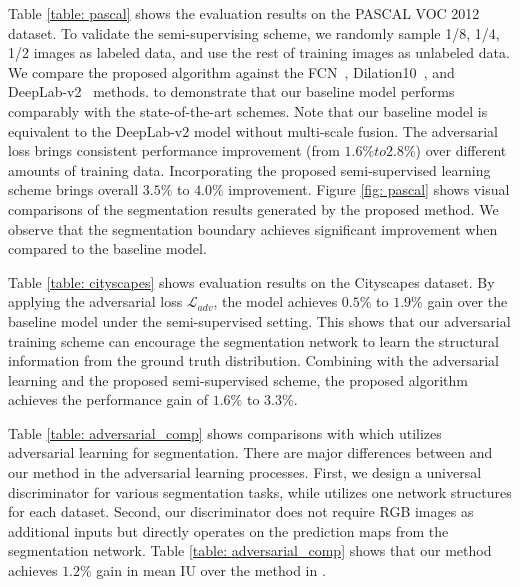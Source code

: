 \documentclass{bmvc2k}
\begin{document}
	\vspace{-2mm}{\flushleft \bf PASCAL VOC 2012.}
	Table \ref{table: pascal} shows the evaluation results on the PASCAL VOC 2012 dataset.
	To validate the semi-supervising scheme, we randomly sample 1/8, 1/4, 1/2 images as labeled data, and use the rest of training images as unlabeled data.
	We compare the proposed algorithm against the FCN~\cite{fcn}, Dilation10~\cite{dilated}, and DeepLab-v2~\cite{deeplab} methods.
	to demonstrate that our baseline model performs comparably with the state-of-the-art schemes.
	Note that our baseline model is equivalent to the DeepLab-v2 model without multi-scale fusion.
	The adversarial loss brings consistent performance improvement (from $1.6\%to 2.8\%$) over different amounts of training data.
	Incorporating the proposed semi-supervised learning scheme brings overall $3.5\%$ to $4.0\%$ improvement.
	Figure \ref{fig: pascal} shows visual comparisons of the segmentation results generated by the proposed method. 
	We observe that the segmentation boundary achieves significant improvement when compared to the baseline model.
	
	\vspace{-2mm}{\flushleft \bf Cityscapes.}
	Table \ref{table: cityscapes} shows evaluation results on the Cityscapes dataset.
	By applying the adversarial loss $\mathcal{L}_{adv}$, the model achieves $0.5\%$ to $1.9\%$ gain over the baseline model under the semi-supervised setting.
	This shows that our adversarial training scheme can encourage the segmentation network to learn the structural information from the ground truth distribution.
	Combining with  the adversarial learning and the proposed semi-supervised scheme, 
	the proposed algorithm achieves the performance gain of $1.6\%$ to $3.3\%$. 
	
	\vspace{-2mm}{\flushleft \bf Comparisons with state-of-the-art methods.}
	Table \ref{table: adversarial_comp} shows comparisons with \cite{luc2016semantic} which utilizes adversarial learning for segmentation. 
	There are major differences between \cite{luc2016semantic} and our method
	in the adversarial learning processes. 
	First, we design a universal discriminator for various segmentation tasks, while \cite{luc2016semantic} utilizes one network structures for each dataset.
	Second, our discriminator does not require RGB images as additional inputs 
	but directly operates on the prediction maps from the segmentation network.
	Table \ref{table: adversarial_comp} shows that our method achieves $1.2\%$ gain in mean IU over the method in \cite{luc2016semantic}.
	
\end{document}
